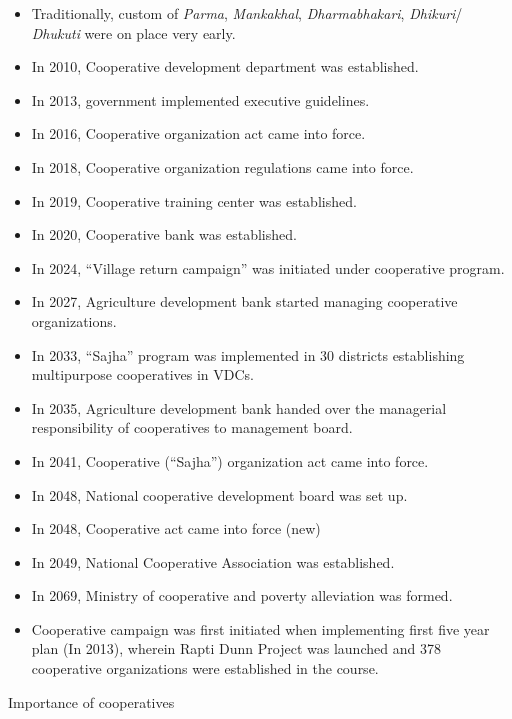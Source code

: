 \documentclass[
]{book}
\begin{document}
\begin{itemize}
\item
  Traditionally, custom of \emph{Parma}, \emph{Mankakhal}, \emph{Dharmabhakari}, \emph{Dhikuri}/ \emph{Dhukuti} were on place very early.
\item
  In 2010, Cooperative development department was established.
\item
  In 2013, government implemented executive guidelines.
\item
  In 2016, Cooperative organization act came into force.
\item
  In 2018, Cooperative organization regulations came into force.
\item
  In 2019, Cooperative training center was established.
\item
  In 2020, Cooperative bank was established.
\item
  In 2024, ``Village return campaign'' was initiated under cooperative program.
\item
  In 2027, Agriculture development bank started managing cooperative organizations.
\item
  In 2033, ``Sajha'' program was implemented in 30 districts establishing multipurpose cooperatives in VDCs.
\item
  In 2035, Agriculture development bank handed over the managerial responsibility of cooperatives to management board.
\item
  In 2041, Cooperative (``Sajha'') organization act came into force.
\item
  In 2048, National cooperative development board was set up.
\item
  In 2048, Cooperative act came into force (new)
\item
  In 2049, National Cooperative Association was established.
\item
  In 2069, Ministry of cooperative and poverty alleviation was formed.
\item
  Cooperative campaign was first initiated when implementing first five year plan (In 2013), wherein Rapti Dunn Project was launched and 378 cooperative organizations were established in the course.
\end{itemize}

Importance of cooperatives
\end{document}
